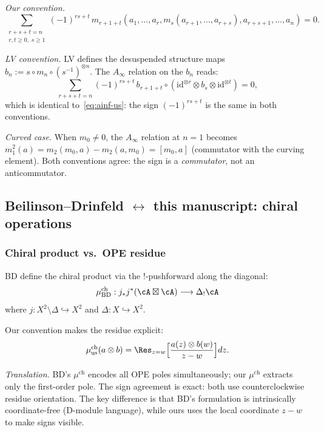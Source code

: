 \emph{Our convention.}
\begin{equation}\label{eq:ainf-us}
\sum_{\substack{r+s+t = n \\ r,t \geq 0,\; s \geq 1}}
 (-1)^{rs + t}\, m_{r+1+t}(a_1,\ldots,a_r, m_s(a_{r+1},\ldots,a_{r+s}), a_{r+s+1},\ldots,a_n) = 0.
\end{equation}

\emph{LV convention.} LV defines the desuspended structure maps
$b_n := s \circ m_n \circ (s^{-1})^{\otimes n}$.
The $A_\infty$ relation on the $b_n$ reads:
\[
\sum_{r+s+t=n} (-1)^{rs+t}\, b_{r+1+t} \circ (\mathrm{id}^{\otimes r} \otimes b_s \otimes \mathrm{id}^{\otimes t}) = 0,
\]
which is identical to~\eqref{eq:ainf-us}: the sign $(-1)^{rs+t}$ is the same in both conventions.

\emph{Curved case.} When $m_0 \neq 0$, the $A_\infty$ relation at $n=1$ becomes
$m_1^2(a) = m_2(m_0, a) - m_2(a, m_0) = [m_0, a]$ (commutator with the curving element).
Both conventions agree: the sign is a \emph{commutator}, not an anticommutator.

\subsection{Beilinson--Drinfeld $\leftrightarrow$ this manuscript: chiral operations}
\label{sec:bd-us-formulas}

\subsubsection{Chiral product vs.\ OPE residue}

BD define the chiral product via the $!$-pushforward along the diagonal:
\[
\mu^{\mathrm{ch}}_{\mathrm{BD}}: j_*j^*(\cA \boxtimes \cA) \longrightarrow \Delta_! \cA
\]
where $j: X^2 \setminus \Delta \hookrightarrow X^2$ and $\Delta: X \hookrightarrow X^2$.

Our convention makes the residue explicit:
\[
\mu^{\mathrm{ch}}_{\mathrm{us}}(a \otimes b) = \Res_{z=w}\Bigl[\frac{a(z) \otimes b(w)}{z - w}\Bigr] dz.
\]

\emph{Translation.} BD's $\mu^{\mathrm{ch}}$ encodes all OPE poles simultaneously;
our $\mu^{\mathrm{ch}}$ extracts only the first-order pole. The sign agreement
is exact: both use counterclockwise residue orientation. The key difference
is that BD's formulation is intrinsically coordinate-free (D-module language),
while ours uses the local coordinate $z - w$ to make signs visible.

